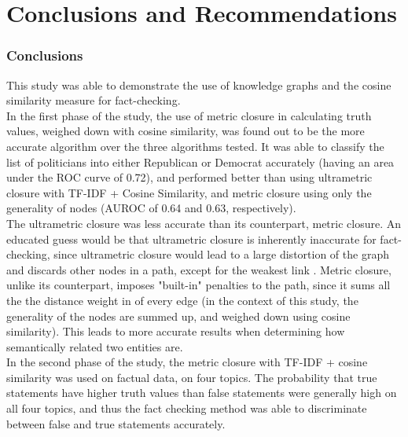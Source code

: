 \documentclass[10pt,11pt,12pt,oneside]{book}
\begin{document}
\newpage

\chapter{Conclusions and Recommendations}

\subsection{Conclusions}
This study was able to demonstrate the use of knowledge graphs and the cosine similarity measure for fact-checking. \\

In the first phase of the study, the use of metric closure in calculating truth values, weighed down with cosine similarity, was found out to be the more accurate algorithm over the three algorithms tested. It was able to classify the list of politicians into either Republican or Democrat accurately (having an area under the ROC curve of 0.72), and performed better than using ultrametric closure with TF-IDF + Cosine Similarity, and metric closure using only the generality of nodes (AUROC of 0.64 and 0.63, respectively).\\

The ultrametric closure was less accurate than its counterpart, metric closure. An educated guess would be that ultrametric closure is inherently inaccurate for fact-checking, since ultrametric closure would lead to a large distortion of the graph and discards other nodes in a path, except for the weakest link \cite{simas2015distance}. Metric closure, unlike its counterpart, imposes "built-in" penalties to the path, since it sums all the the distance weight in of every edge \cite{simas2015distance} (in the context of this study, the generality of the nodes are summed up, and weighed down using cosine similarity). This leads to more accurate results when determining how semantically related two entities are.\\

In the second phase of the study, the metric closure with TF-IDF + cosine similarity was used on factual data, on four topics. The probability that true statements have higher truth values than false statements were generally high on all four topics, and thus the fact checking method was able to discriminate between false and true statements accurately.\\
\end{document}
